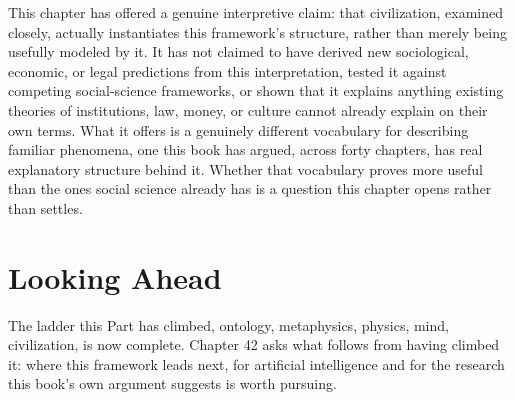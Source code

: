 This chapter has offered a genuine interpretive claim: that civilization, examined closely, actually instantiates this framework's structure, rather than merely being usefully modeled by it. It has not claimed to have derived new sociological, economic, or legal predictions from this interpretation, tested it against competing social-science frameworks, or shown that it explains anything existing theories of institutions, law, money, or culture cannot already explain on their own terms. What it offers is a genuinely different vocabulary for describing familiar phenomena, one this book has argued, across forty chapters, has real explanatory structure behind it. Whether that vocabulary proves more useful than the ones social science already has is a question this chapter opens rather than settles.

\section{Looking Ahead}

The ladder this Part has climbed, ontology, metaphysics, physics, mind, civilization, is now complete. Chapter 42 asks what follows from having climbed it: where this framework leads next, for artificial intelligence and for the research this book's own argument suggests is worth pursuing.
